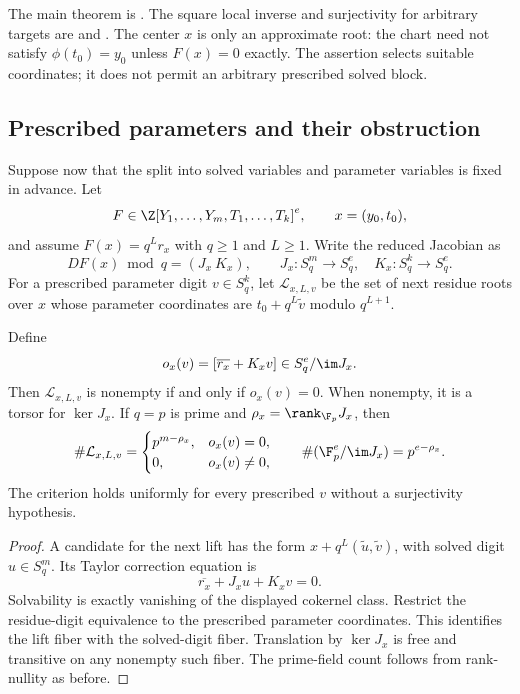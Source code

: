 The main theorem is
.
The square local inverse and surjectivity for arbitrary targets are
 and
.
The center $x$ is only an approximate root: the chart need not satisfy
$\phi(t_0)=y_0$ unless $F(x)=0$ exactly. The assertion selects suitable
coordinates; it does not permit an arbitrary prescribed solved block.

\subsection{Prescribed parameters and their obstruction}

Suppose now that the split into solved variables and parameter variables
is fixed in advance. Let
\[
 F\in\Z[Y_1,\ldots,Y_m,T_1,\ldots,T_k]^e,\qquad x=(y_0,t_0),
\]
and assume $F(x)=q^Lr_x$ with $q\ge1$ and $L\ge1$. Write the reduced
Jacobian as
\[
 DF(x)\bmod q=(J_x\ K_x),\qquad
 J_x:S_q^m\to S_q^e,\quad K_x:S_q^k\to S_q^e.
\]
For a prescribed parameter digit $v\in S_q^k$, let $\mathcal L_{x,L,v}$
be the set of next residue roots over $x$ whose parameter coordinates are
$t_0+q^L\widetilde v$ modulo $q^{L+1}$.

\begin{theorem}
\label{thm:prescribed-obstruction}
Define
\[
 o_x(v)=[\overline{r_x}+K_xv]\in S_q^e/\im J_x.
\]
Then $\mathcal L_{x,L,v}$ is nonempty if and only if $o_x(v)=0$.
When nonempty, it is a torsor for $\ker J_x$. If $q=p$ is prime and
$\rho_x=\rank_{\F_p}J_x$, then
\begin{equation}\label{eq:prescribed-count}
 \#\mathcal L_{x,L,v}
 =\begin{cases}p^{m-\rho_x},&o_x(v)=0,\\0,&o_x(v)\ne0,\end{cases}
 \qquad \#(\F_p^e/\im J_x)=p^{e-\rho_x}.
\end{equation}
The criterion holds uniformly for every prescribed $v$ without a
surjectivity hypothesis.
\end{theorem}

\begin{proof}
A candidate for the next lift has the form
$x+q^L(\widetilde u,\widetilde v)$, with solved digit $u\in S_q^m$.
Its Taylor correction equation is
\[
 \overline{r_x}+J_xu+K_xv=0.
\]
Solvability is exactly vanishing of the displayed cokernel class. Restrict
the residue-digit equivalence to the prescribed parameter coordinates.
This identifies the lift fiber with the solved-digit fiber.
Translation by $\ker J_x$ is free and transitive on any nonempty such
fiber. The prime-field count follows from rank-nullity as before.
\end{proof}

